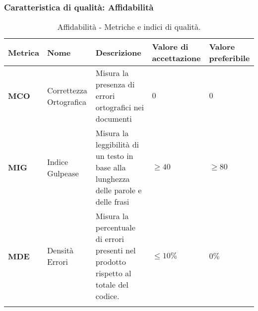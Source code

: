 \subsubsection{Caratteristica di qualità: Affidabilità}
\hspace{1pt}
    \begin{longtable}{|C{1.5cm}|L{3cm}|L{4cm}|L{2.5cm}|L{2.5cm}|}
            \hline
            \textbf{Metrica} & \textbf{Nome} & \textbf{Descrizione} & \textbf{Valore di accettazione} & \textbf{Valore preferibile} \\
            \hline
             \textbf{MCO} & Correttezza Ortografica & Misura la presenza di errori ortografici nei documenti & $0$ & $0$ \\
            \hline
            \textbf{MIG} & Indice Gulpease & Misura la leggibilità di un testo in base alla lunghezza delle parole e delle frasi & $\geq 40$ & $\geq 80$ \\
            \hline
            \textbf{MDE} & Densità Errori & Misura la percentuale di errori presenti nel prodotto rispetto al totale del codice. & $\leq 10\%$ & $ 0\%$ \\
            \hline
            \caption{Affidabilità - Metriche e indici di qualità.}
        \label{tab:metriche_affidabilità_testo}
    \end{longtable}

